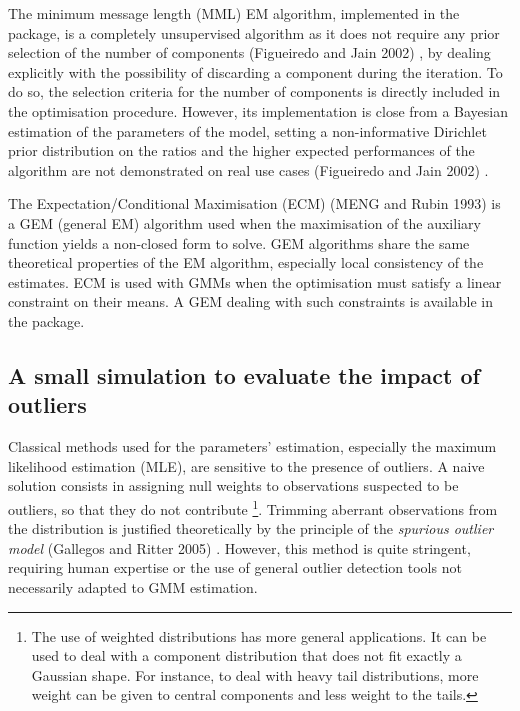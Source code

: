 The minimum message length (MML) EM algorithm, implemented in the
 package, is a completely unsupervised algorithm as it
does not require any prior selection of the number of components
(Figueiredo and Jain 2002) , by dealing explicitly with the possibility of
discarding a component during the iteration. To do so, the selection
criteria for the number of components is directly included in the
optimisation procedure. However, its implementation is close from a
Bayesian estimation of the parameters of the model, setting a
non-informative Dirichlet prior distribution on the ratios and the
higher expected performances of the algorithm are not demonstrated on
real use cases (Figueiredo and Jain 2002) .

The Expectation/Conditional Maximisation (ECM) (MENG and Rubin 1993) is a GEM
(general EM) algorithm used when the maximisation of the auxiliary
function yields a non-closed form to solve. GEM algorithms share the
same theoretical properties of the EM algorithm, especially local
consistency of the estimates. ECM is used with GMMs when the
optimisation must satisfy a linear constraint on their means. A GEM
dealing with such constraints is available in the 
package.

\hypertarget{a-small-simulation-to-evaluate-the-impact-of-outliers}{%
\subsection{A small simulation to evaluate the impact of outliers}\label{a-small-simulation-to-evaluate-the-impact-of-outliers}}

Classical methods used for the parameters' estimation, especially the
maximum likelihood estimation (MLE), are sensitive to the presence of
outliers. A naive solution consists in assigning null weights to
observations suspected to be outliers, so that they do not contribute
\footnote{The use of weighted distributions has more general applications.
  It can be used to deal with a component distribution that does not
  fit exactly a Gaussian shape. For instance, to deal with heavy tail
  distributions, more weight can be given to central components and
  less weight to the tails.}. Trimming aberrant observations from the distribution is justified
theoretically by the principle of the \emph{spurious outlier model}
(Gallegos and Ritter 2005) . However, this method is quite stringent,
requiring human expertise or the use of general outlier detection tools
not necessarily adapted to GMM estimation.

